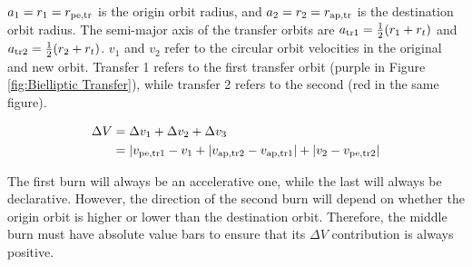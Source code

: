 \documentclass[../basicOrbitalDynamics.tex]{subfiles}
\begin{document}
$a_1=r_1={r}_\text{pe,tr}$ is the origin orbit radius, and $a_2=r_2={r}_\text{ap,tr}$ is the destination orbit radius. The semi-major axis of the transfer orbits are ${a}_\text{tr1}=\frac{1}{2}(r_1+r_t)$ and ${a}_\text{tr2}=\frac{1}{2}(r_2+r_t)$. $v_1$ and $v_2$ refer to the circular orbit velocities in the original and new orbit. Transfer 1 refers to the first transfer orbit (purple in Figure  \ref{fig:Bielliptic Transfer}), while transfer 2 refers to the second (red in the same figure).

\begin{align*}
    \Delta V &= \Delta v_1+\Delta v_2+\Delta v_3 \\
    &= |{v}_\text{pe,tr1}-v_1+|{v}_\text{ap,tr2}-{v}_\text{ap,tr1}|+|v_2-{v}_\text{pe,tr2}| \\
\end{align*}

The first burn will always be an accelerative one, while the last will always be declarative. However, the direction of the second burn will depend on whether the origin orbit is higher or lower than the destination orbit. Therefore, the middle burn must have absolute value bars to ensure that its $\Delta V$ contribution is always positive.
\end{document}
